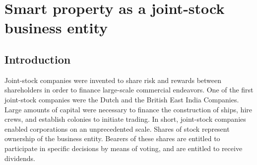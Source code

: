 






\chapter{Smart property as a joint-stock business entity}

\section{Introduction}

Joint-stock companies were invented to share risk and rewards between shareholders in order to finance large-scale commercial endeavors. One of the first joint-stock companies were the Dutch and the British East India Companies. Large amounts of capital were necessary to finance the construction of ships, hire crews, and establish colonies to initiate trading. In short, joint-stock companies enabled corporations on an unprecedented scale. Shares of stock represent  ownership of the business entity. Bearers of these shares are entitled to participate in specific decisions by means of voting, and are entitled to receive dividends. 


